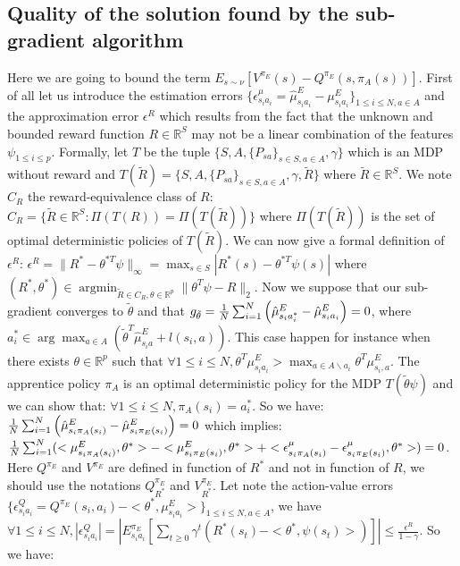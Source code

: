\documentclass{article}
\newcommand{\argmin}{\operatorname*{argmin}}
\begin{document}
\subsection{Quality of the solution found by the sub-gradient algorithm}
Here we are going to bound the term $E_{s\sim\nu}[V^{\pi_E}(s)-Q^{\pi_E}(s,\pi_A(s))]$. First of all let us introduce the estimation errors $\{\epsilon^{\mu}_{s_ia_i}=\hat{\mu}^E_{s_ia_i}-\mu^E_{s_ia_i}\}_{1\leq i \leq N,a\in A}$ and the
approximation error $\epsilon^R$ which results from the fact that the unknown and bounded reward function $R\in\mathbb{R}^S$ may not be a linear combination of the features $\psi_{1\leq i \leq p}$. Formally, let $T$ be the tuple $\{S,A,\{P_{sa}\}_{s\in S,a\in A},\gamma\}$ which is
an MDP without reward and $T(\tilde{R})=\{S,A,\{P_{sa}\}_{s\in S,a\in A},\gamma,\tilde{R}\}$ where $\tilde{R}\in\mathbb{R}^S$. We note $C_R$ the reward-equivalence class of $R$: $C_R=\{\tilde{R}\in\mathbb{R}^S: \Pi(T(R))=\Pi(T(\tilde{R}))\}$ where $\Pi(T(\tilde{R}))$ is the set of optimal deterministic policies
of $T(\tilde{R})$. We can now give a formal definition of $\epsilon^R$: $\epsilon^R=\|R^*-\theta^{*T}\psi\|_\infty=\max_{s\in S}|R^*(s)-\theta^{*T}\psi(s)|$ where $(R^*,\theta^*)\in\argmin_{\tilde{R}\in C_R, \theta\in\mathbb{R}^p}{\|\theta^T\psi-R\|_2}$.
Now we suppose that our sub-gradient converges to $\tilde{\theta}$ and that $g_{\tilde{\theta}}={1\over N}\sum_{i=1}^N\left(\hat{\mu}^E_{s_ia^*_i} - \hat{\mu}^E_{s_ia_i}\right)=0$, where $a^*_i\in\arg\max_{a\in A}(\tilde{\theta}^T \hat{\mu}^E_{s_ia} + l(s_i,a))$.
This case happen for instance when there exists $\theta\in\mathbb{R}^p$ such that $\forall 1\leq i \leq N, \theta^T\mu^E_{s_ia_i}>\max_{a\in A \backslash a_i}\theta^T\mu^E_{s_i,a}$. The apprentice policy $\pi_A$ is an optimal deterministic policy
for the MDP $T(\tilde{\theta}\psi)$ and we can show that: $\forall 1\leq i\leq N, \pi_A(s_i)=a_i^*$. So we have: ${1\over N}\sum_{i=1}^N\left(\hat{\mu}^E_{s_i\pi_A(s_i)} - \hat{\mu}^E_{s_i\pi_E(s_i)}\right)=0$ which implies: ${1\over N}\sum_{i=1}^N(<\mu^E_{s_i\pi_A(s_i)},\theta^*>-<\mu^E_{s_i\pi_E(s_i)},\theta^*>+<\epsilon^{\mu}_{s_i\pi_A(s_i)}-\epsilon^{\mu}_{s_i\pi_E(s_i)},\theta^*>)=0$.
Here $Q^{\pi_E}$ and $V^{\pi_E}$ are defined in function of $R^*$ and not in function of $R$, we should use the notations $Q^{\pi_E}_{R^*}$ and $V^{\pi_E}_{R^*}$.
Let note the action-value errors $\{\epsilon^Q_{s_ia_i}=Q^{\pi_E}(s_i,a_i)-<\theta^*,\mu^E_{s_ia_i}>\}_{1\leq i \leq N,a\in A}$, we have $\forall 1\leq i\leq N, |\epsilon^Q_{s_ia_i}|=|E^{\pi_E}_{s_ia_i}[\sum_{t\geq0}\gamma^t(R^*(s_t)-<\theta^*,\psi(s_t)>)]|\leq\frac{\epsilon^R}{1-\gamma}$. So we have:
\end{document}
